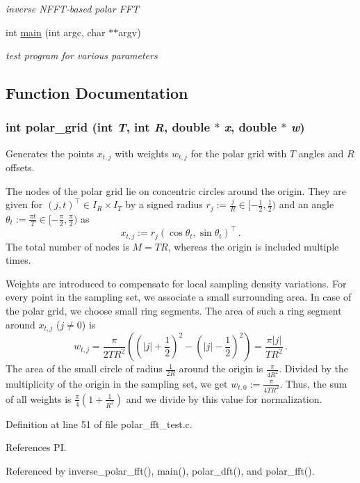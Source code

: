 \begin{CompactItemize}
\begin{CompactList}\small\item\em inverse NFFT-based polar FFT \item\end{CompactList}\item 
\hypertarget{group__applications__polarFFT__polar_ga4}{
int \hyperlink{group__applications__polarFFT__polar_ga4}{main} (int argc, char $\ast$$\ast$argv)}
\label{group__applications__polarFFT__polar_ga4}

\begin{CompactList}\small\item\em test program for various parameters \item\end{CompactList}\end{CompactItemize}


\subsection{Function Documentation}
\hypertarget{group__applications__polarFFT__polar_ga0}{
\subsubsection[polar\_\-grid]{\setlength{\rightskip}{0pt plus 5cm}int polar\_\-grid (int {\em T}, int {\em R}, double $\ast$ {\em x}, double $\ast$ {\em w})}}
\label{group__applications__polarFFT__polar_ga0}


Generates the points $x_{t,j}$ with weights $w_{t,j}$ for the polar grid with $T$ angles and $R$ offsets. 

The nodes of the polar grid lie on concentric circles around the origin. They are given for $(j,t)^{\top}\in I_R\times I_T$ by a signed radius $r_j := \frac{j}{R} \in [-\frac{1}{2},\frac{1}{2})$ and an angle $\theta_t := \frac{\pi t}{T} \in [-\frac{\pi}{2},\frac{\pi}{2})$ as \[ x_{t,j} := r_j\left(\cos\theta_t, \sin\theta_t\right)^{\top}\,. \] The total number of nodes is $M=TR$, whereas the origin is included multiple times.

Weights are introduced to compensate for local sampling density variations. For every point in the sampling set, we associate a small surrounding area. In case of the polar grid, we choose small ring segments. The area of such a ring segment around $x_{t,j}$ ($j \ne 0$) is \[ w_{t,j} = \frac{\pi}{2TR^2}\left(\left(|j|+\frac{1}{2}\right)^2- \left(|j|-\frac{1}{2}\right)^2\right) = \frac{\pi |j| }{TR^2}\, . \] The area of the small circle of radius $\frac{1}{2R}$ around the origin is $\frac{\pi}{4R^2}$. Divided by the multiplicity of the origin in the sampling set, we get $w_{t,0} := \frac{\pi}{4TR^2}$. Thus, the sum of all weights is $\frac{\pi}{4}(1+\frac{1}{R^2})$ and we divide by this value for normalization. 

Definition at line 51 of file polar\_\-fft\_\-test.c.

References PI.

Referenced by inverse\_\-polar\_\-fft(), main(), polar\_\-dft(), and polar\_\-fft().